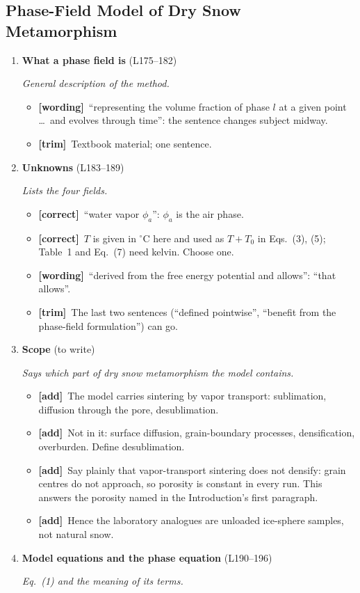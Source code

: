 \documentclass[11pt]{article}
\newcommand{\Pg}[3]{\item \textbf{#1} {\small(#2)}\par\textit{#3}}
\newcommand{\tC}{\textcolor{miss}{\textbf{[correct]}}\ }
\newcommand{\tG}{\textcolor{stale}{\textbf{[wording]}}\ }
\newcommand{\tT}{\textcolor{cut}{\textbf{[trim]}}\ }
\newcommand{\tA}{\textcolor{have}{\textbf{[add]}}\ }
\begin{document}
\subsection{Phase-Field Model of Dry Snow Metamorphism}
\begin{enumerate}
\Pg{What a phase field is}{L175--182}{General description of the method.}
  \begin{itemize}
  \item \tG ``representing the volume fraction of phase $l$ at a given point
    \ldots\ and evolves through time'': the sentence changes subject midway.
  \item \tT Textbook material; one sentence.
  \end{itemize}
\Pg{Unknowns}{L183--189}{Lists the four fields.}
  \begin{itemize}
  \item \tC ``water vapor $\phi_a$'': $\phi_a$ is the air phase.
  \item \tC $T$ is given in $^{\circ}$C here and used as $T + T_0$ in
    Eqs.~(3), (5); Table~1 and Eq.~(7) need kelvin. Choose one.
  \item \tG ``derived from the free energy potential and allows'': ``that
    allows''.
  \item \tT The last two sentences (``defined pointwise'', ``benefit from the
    phase-field formulation'') can go.
  \end{itemize}
\Pg{Scope}{to write}{Says which part of dry snow metamorphism the model contains.}
  \begin{itemize}
  \item \tA The model carries sintering by vapor transport: sublimation,
    diffusion through the pore, desublimation.
  \item \tA Not in it: surface diffusion, grain-boundary processes,
    densification, overburden. Define desublimation.
  \item \tA Say plainly that vapor-transport sintering does not densify: grain
    centres do not approach, so porosity is constant in every run. This
    answers the porosity named in the Introduction's first paragraph.
  \item \tA Hence the laboratory analogues are unloaded ice-sphere samples,
    not natural snow.
  \end{itemize}
\Pg{Model equations and the phase equation}{L190--196}{Eq.~(1) and the meaning of its terms.}
  \begin{itemize}

\end{itemize}
\end{enumerate}
\end{document}
